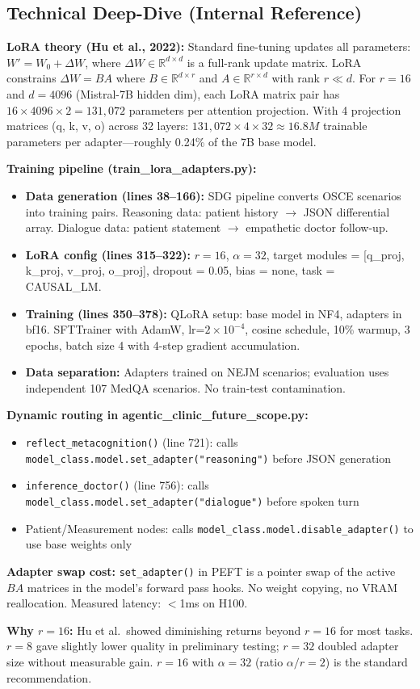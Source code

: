 \documentclass[12pt]{article}
\begin{document}
  \subsection*{Technical Deep-Dive (Internal Reference)}
  {\color{techgray}
  \textbf{LoRA theory (Hu et al., 2022):} Standard fine-tuning updates all parameters: $W' = W_0 + \Delta W$, where $\Delta W \in \mathbb{R}^{d \times d}$ is a full-rank update matrix. LoRA constrains $\Delta W = BA$ where $B \in \mathbb{R}^{d \times r}$ and $A \in \mathbb{R}^{r \times d}$ with rank $r \ll d$. For $r=16$ and $d=4096$ (Mistral-7B hidden dim), each LoRA matrix pair has $16 \times 4096 \times 2 = 131,072$ parameters per attention projection. With 4 projection matrices (q, k, v, o) across 32 layers: $131,072 \times 4 \times 32 \approx 16.8M$ trainable parameters per adapter---roughly 0.24\% of the 7B base model.

  \textbf{Training pipeline (train\_lora\_adapters.py):}
  \begin{itemize}
    \item \textbf{Data generation (lines 38--166):} SDG pipeline converts OSCE scenarios into training pairs. Reasoning data: patient history $\to$ JSON differential array. Dialogue data: patient statement $\to$ empathetic doctor follow-up.
    \item \textbf{LoRA config (lines 315--322):} $r=16$, $\alpha=32$, target modules = [q\_proj, k\_proj, v\_proj, o\_proj], dropout = 0.05, bias = none, task = CAUSAL\_LM.
    \item \textbf{Training (lines 350--378):} QLoRA setup: base model in NF4, adapters in bf16. SFTTrainer with AdamW, lr=$2 \times 10^{-4}$, cosine schedule, 10\% warmup, 3 epochs, batch size 4 with 4-step gradient accumulation.
    \item \textbf{Data separation:} Adapters trained on NEJM scenarios; evaluation uses independent 107 MedQA scenarios. No train-test contamination.
  \end{itemize}

  \textbf{Dynamic routing in agentic\_clinic\_future\_scope.py:}
  \begin{itemize}
    \item \texttt{reflect\_metacognition()} (line 721): calls \texttt{model\_class.model.set\_adapter("reasoning")} before JSON generation
    \item \texttt{inference\_doctor()} (line 756): calls \texttt{model\_class.model.set\_adapter("dialogue")} before spoken turn
    \item Patient/Measurement nodes: calls \texttt{model\_class.model.disable\_adapter()} to use base weights only
  \end{itemize}

  \textbf{Adapter swap cost:} \texttt{set\_adapter()} in PEFT is a pointer swap of the active $BA$ matrices in the model's forward pass hooks. No weight copying, no VRAM reallocation. Measured latency: $<$1ms on H100.

  \textbf{Why $r=16$:} Hu et al.\ showed diminishing returns beyond $r=16$ for most tasks. $r=8$ gave slightly lower quality in preliminary testing; $r=32$ doubled adapter size without measurable gain. $r=16$ with $\alpha=32$ (ratio $\alpha/r = 2$) is the standard recommendation.
  }
\end{document}
